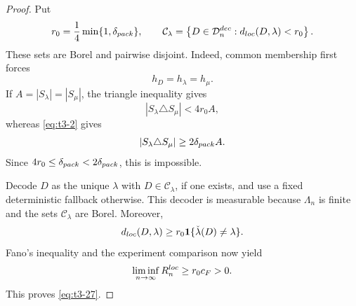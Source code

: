 \documentclass[10pt,a4paper]{amsart}
\begin{document}
\begin{proof}
Put
\[
r_0
=
\frac14\min\{1,\delta_{\rm pack}\},
\qquad
\mathcal C_\lambda
=
\left\{
D\in\mathcal D_n^{\rm dec}:
d_{\rm loc}(D,\lambda)<r_0
\right\}.
\]
These sets are Borel and pairwise disjoint.  Indeed, common membership
first forces
\[
h_D=h_\lambda=h_\mu.
\]
If \(A=|S_\lambda|=|S_\mu|\), the triangle inequality gives
\[
|S_\lambda\triangle S_\mu|<4r_0A,
\]
whereas \eqref{eq:t3-2} gives
\[
|S_\lambda\triangle S_\mu|
\ge2\delta_{\rm pack}A.
\]
Since \(4r_0\le\delta_{\rm pack}<2\delta_{\rm pack}\), this is
impossible.

Decode \(D\) as the unique \(\lambda\) with
\(D\in\mathcal C_\lambda\), if one exists, and use a fixed
deterministic fallback otherwise.  This decoder is measurable because
\(\Lambda_n\) is finite and the sets \(\mathcal C_\lambda\) are
Borel.  Moreover,
\[
d_{\rm loc}(D,\lambda)
\ge
r_0\mathbf 1\{\check\lambda(D)\ne\lambda\}.
\]
Fano's inequality and the experiment comparison now yield
\[
\liminf_{n\to\infty}R_n^{\rm loc}
\ge
r_0c_F>0.
\]
This proves \eqref{eq:t3-27}.
\end{proof}
\end{document}
